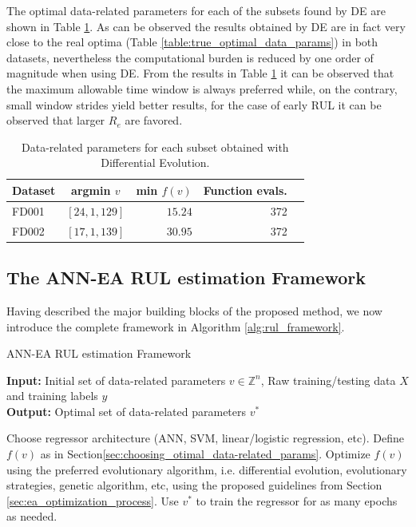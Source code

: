 \documentclass{article}
\begin{document}
The optimal data-related parameters for each of the subsets found by DE are shown in Table \ref{table:optimal_data_params}. As can be observed the results obtained by DE are in fact very close to the real optima (Table \ref{table:true_optimal_data_params}) in both datasets, nevertheless the computational burden is reduced by one order of magnitude when using DE. From the results in Table \ref{table:optimal_data_params} it can be observed that the maximum allowable time window is always preferred while, on the contrary, small window strides yield better results, for the case of early RUL it can be observed that larger $R_e$ are favored.

\begin{table}[!htb]
\centering
\begin{tabular}{l | c r r l}
	\hline
	 Dataset & argmin $v$ & min $f(v)$ & Function evals.\\
  	\hline
  	FD001 & $\left[ 24, 1, 129 \right]$ & $15.24$ & 372\\
  	FD002 & $\left[ 17, 1, 139 \right]$ & $30.95$ & 372\\
  	\hline
\end{tabular}
\caption{Data-related parameters for each subset obtained with Differential Evolution.}
\label{table:optimal_data_params}
\end{table}

\subsection{The ANN-EA RUL estimation Framework}

Having described the major building blocks of the proposed method, we now introduce the complete framework in Algorithm \ref{alg:rul_framework}.

\setcounter{algorithm}{0}
\begin{algorithm}[H]
\caption{ANN-EA RUL estimation Framework}\label{alg:rul_framework}
\textbf{Input:} Initial set of data-related parameters $v \in \mathbb{Z}^n$, Raw training/testing data $X$ and training labels $y$\\
\textbf{Output:} Optimal set of data-related parameters $v^*$
	\begin{algorithmic}[1]
		\State Choose regressor architecture (ANN, SVM, linear/logistic regression, etc).
		\State Define $f(v)$ as in Section\ref{sec:choosing_otimal_data-related_params}.
		\State Optimize $f(v)$ using the preferred evolutionary algorithm, i.e. differential evolution, evolutionary strategies, genetic algorithm, etc, using the proposed guidelines from Section \ref{sec:ea_optimization_process}.
		\State Use $v^*$ to train the regressor for as many epochs as needed.
	\end{algorithmic}
\end{algorithm}
\end{document}
